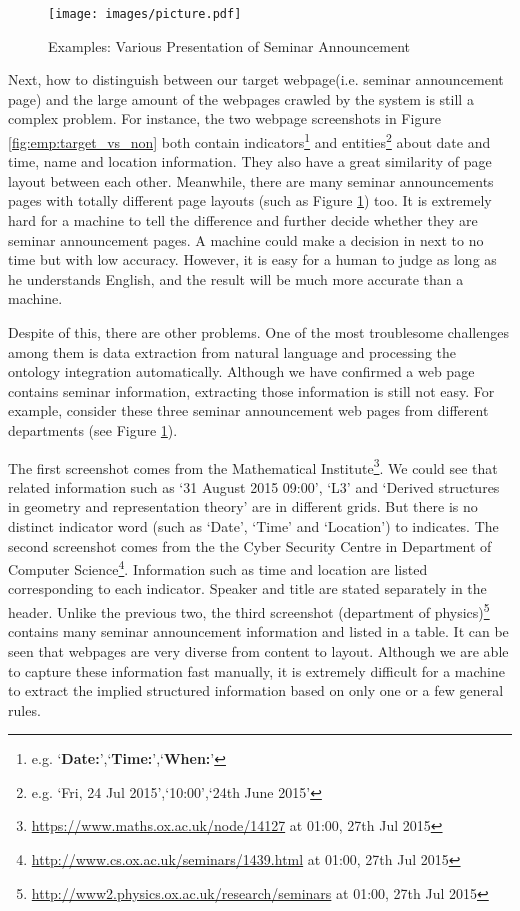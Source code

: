 \begin{figure}[htbp!]
	\centering
	\texttt{[image: images/picture.pdf]}
	\caption{Examples: Various Presentation of Seminar Announcement}\label{fig:emp:various_present}
\end{figure}

Next, how to distinguish between our target webpage(i.e. seminar announcement page) and the large amount of the webpages crawled by the system is still a complex problem. For instance, the two webpage screenshots in Figure \ref{fig:emp:target_vs_non} both contain indicators\footnote{e.g. `\textbf{Date:}',`\textbf{Time:}',`\textbf{When:}'} and entities\footnote{e.g. `Fri, 24 Jul 2015',`10:00',`24th June 2015'} about date and time, name and location information. They also have a great similarity of page layout between each other. Meanwhile, there are many seminar announcements pages with totally different page layouts (such as Figure \ref{fig:emp:various_present}) too. It is extremely hard for a machine to tell the difference and further decide whether they are seminar announcement pages. A machine could make a decision in next to no time but with low accuracy. However, it is easy for a human to judge as long as he understands English, and the result will be much more accurate than a machine.

Despite of this, there are other problems. One of the most troublesome challenges among them is data extraction from natural language and processing the ontology integration automatically\cite{maedche2003bootstrapping}. Although we have confirmed a web page contains seminar information, extracting those information is still not easy. For example, consider these three seminar announcement web pages from different departments (see Figure \ref{fig:emp:various_present}). 

The first screenshot comes from the Mathematical Institute\footnote{ \url{https://www.maths.ox.ac.uk/node/14127} at 01:00, 27th Jul 2015 }. We could see that related information such as `31 August 2015 09:00', `L3' and `Derived structures in geometry and representation theory' are in different grids. But there is no distinct indicator word (such as `Date', `Time' and `Location') to indicates. The second screenshot comes from the the Cyber Security Centre in Department of Computer Science\footnote{ \url{http://www.cs.ox.ac.uk/seminars/1439.html} at 01:00, 27th Jul 2015 }. Information such as time and location are listed corresponding to each indicator. Speaker and title are stated separately in the header. Unlike the previous two, the third screenshot (department of physics)\footnote{ \url{http://www2.physics.ox.ac.uk/research/seminars} at 01:00, 27th Jul 2015 } contains many seminar announcement information and listed in a table. It can be seen that webpages are very diverse from content to layout. Although we are able to capture these information fast manually, it is extremely difficult for a machine to extract the implied structured information based on only one or a few general rules.

